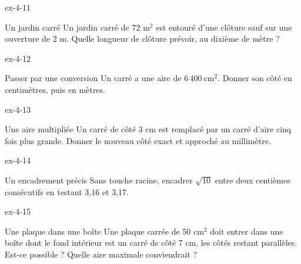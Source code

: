 \begin{blocLivre}{ex-4-11}\begin{exercice}[3]{Un jardin carré}
Un jardin carré de 72 m$^2$ est entouré d’une clôture sauf sur une ouverture de 2 m. Quelle longueur de clôture prévoir, au dixième de mètre ?
\label{fig-ex-4-11}
\end{exercice}\end{blocLivre}
\begin{blocLivre}{ex-4-12}\begin{exercice}[3]{Passer par une conversion}
Un carré a une aire de $6\,400\ \mathrm{cm}^2$. Donner son côté en centimètres, puis en mètres.
\end{exercice}\end{blocLivre}
\begin{blocLivre}{ex-4-13}\begin{exercice}[3]{Une aire multipliée}
Un carré de côté 3 cm est remplacé par un carré d’aire cinq fois plus grande. Donner le nouveau côté exact et approché au millimètre.
\label{fig-ex-4-13}
\end{exercice}\end{blocLivre}
\begin{blocLivre}{ex-4-14}\begin{exercice}[3]{Un encadrement précis}
Sans touche racine, encadrer $\sqrt{10}$ entre deux centièmes consécutifs en testant 3,16 et 3,17.
\end{exercice}\end{blocLivre}
\begin{blocLivre}{ex-4-15}\begin{exercice}[3]{Une plaque dans une boîte}
Une plaque carrée de 50 cm$^2$ doit entrer dans une boîte dont le fond intérieur est un carré de côté 7 cm, les côtés restant parallèles. Est-ce possible ? Quelle aire maximale conviendrait ?
\label{fig-ex-4-15}
\end{exercice}\end{blocLivre}

\clearpage
